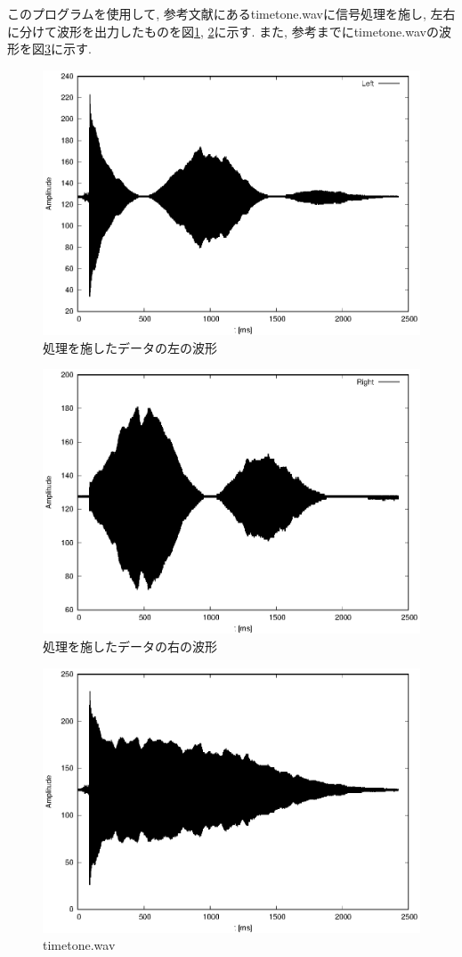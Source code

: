 \documentclass[titlepage]{jsarticle}
\begin{document}
    このプログラムを使用して, 参考文献\cite{Support Page}にあるtimetone.wavに信号処理を施し,
    左右に分けて波形を出力したものを図\ref{fig:revl}, \ref{fig:revr}に示す.
    また, 参考までにtimetone.wavの波形を図\ref{fig:timetone}に示す.

    \begin{figure}[h]
        \centering
        \includegraphics[width=0.8\hsize]{images/left.eps}
        \caption{処理を施したデータの左の波形}
        \label{fig:revl}
    \end{figure}

    \begin{figure}[h]
        \centering
        \includegraphics[width=0.8\hsize]{images/right.eps}
        \caption{処理を施したデータの右の波形}
        \label{fig:revr}
    \end{figure}

    \begin{figure}[h]
        \centering
        \includegraphics[width=0.8\hsize]{images/timetone.eps}
        \caption{timetone.wav}
        \label{fig:timetone}
    \end{figure}
\end{document}
